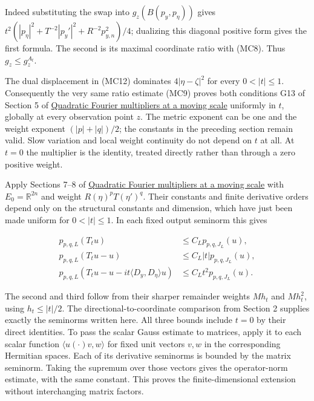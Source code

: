 \documentclass[
  11pt,
]{article}
\begin{document}
Indeed substituting the swap into \(g_z(B(p_y,p_\eta))\) gives
\(t^2(|p_\eta|^2+T^{-2}|p_y'|^2+R^{-2}p_{y,n}^2)/4\); dualizing this
diagonal positive form gives the first formula. The second is its
maximal coordinate ratio with (MC8). Thus \(g_z\leq g_z^{A_t}\).

The dual displacement in (MC12) dominates \(4|\eta-\zeta|^2\) for every
\(0<|t|\leq1\). Consequently the very same ratio estimate (MC9) proves
both conditions G13 of Section 5 of
\href{gauss-transform-estimates.pdf}{Quadratic Fourier multipliers at a
moving scale} uniformly in \(t\), globally at every observation point
\(z\). The metric exponent can be one and the weight exponent
\((|p|+|q|)/2\); the constants in the preceding section remain valid.
Slow variation and local weight continuity do not depend on \(t\) at
all. At \(t=0\) the multiplier is the identity, treated directly rather
than through a zero positive weight.

Apply Sections 7--8 of \href{gauss-transform-estimates.pdf}{Quadratic
Fourier multipliers at a moving scale} with \(E_0=\mathbb R^{2n}\) and
weight \(R(\eta)^pT(\eta')^q\). Their constants and finite derivative
orders depend only on the structural constants and dimension, which have
just been made uniform for \(0<|t|\leq1\). In each fixed output seminorm
this gives

\[
\begin{aligned}
p_{p,q,L}(T_tu)&\leq C_Lp_{p,q,J_L}(u),\\
p_{p,q,L}(T_tu-u)&\leq C_L|t|p_{p,q,J_L}(u),\\
p_{p,q,L}(T_tu-u-it\langle D_y,D_\eta\rangle u)
&\leq C_Lt^2p_{p,q,J_L}(u).
\end{aligned}
\tag{MC13}
\]

The second and third follow from their sharper remainder weights
\(M h_t\) and \(M h_t^2\), using \(h_t\leq|t|/2\). The
directional-to-coordinate comparison from Section 2 supplies exactly the
seminorms written here. All three bounds include \(t=0\) by their direct
identities. To pass the scalar Gauss estimate to matrices, apply it to
each scalar function \(\langle u(\cdot)v,w\rangle\) for fixed unit
vectors \(v,w\) in the corresponding Hermitian spaces. Each of its
derivative seminorms is bounded by the matrix seminorm. Taking the
supremum over those vectors gives the operator-norm estimate, with the
same constant. This proves the finite-dimensional extension without
interchanging matrix factors.
\end{document}
